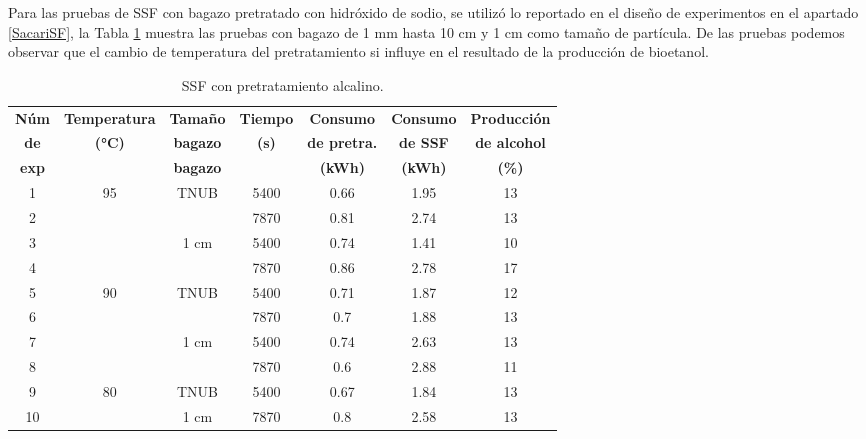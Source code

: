 \documentclass[12pt]{article}
\begin{document}
		Para las pruebas de SSF con bagazo pretratado con hidróxido de sodio, se utilizó lo reportado en el diseño de experimentos en el apartado \ref{SacariSF}, la Tabla \ref{ssf con Pretratamiento Alcalino}  muestra las pruebas con bagazo de 1 mm hasta 10 cm y 1 cm como tamaño de partícula. De las pruebas podemos observar que el cambio de temperatura del pretratamiento si influye en el resultado de la producción de bioetanol.
		
		
		\begin{table}[H]
			\centering
			\caption{SSF con pretratamiento alcalino.}
			\begin{tabular}{|c|c|c|c|c|c|c|}
				\hline
				\textbf{Núm} & \textbf{Temperatura} & \textbf{Tamaño} & \textbf{Tiempo} & \textbf{Consumo } & \textbf{Consumo } & \textbf{Producción } \\
			\textbf{de}	&\textbf{ (°C)}& \textbf{bagazo}&\textbf{(s)}	&\textbf{de pretra. }&\textbf{ de SSF}&\textbf{ de alcohol}\\ 
				\textbf{exp}	& & \textbf{bagazo}&	&\textbf{ (kWh)}&\textbf{ (kWh)}&\textbf{ (\%)}\\ \hline
			
			
				1 & \multirow{4}{*}{95} & \multirow{2}{*}{TNUB} & 5400 &0.66& 1.95 & 13 \\ \cline{1-1} \cline{4-7}
				2 &                     &                       & 7870 &0.81& 2.74 & 13 \\ \cline{3-7}  \cline{1-1}
				3 &                     &\multirow{2}{*}{1 cm}  & 5400 &0.74& 1.41 & 10 \\ \cline{4-7}  \cline{1-1}
				4 &                     &                       & 7870 &0.86& 2.78 & 17 \\ \hline
				5 & \multirow{4}{*}{90} & \multirow{2}{*}{TNUB} & 5400 &0.71& 1.87 & 12 \\  \cline{1-1} \cline{4-7}
				6 &                     &                       & 7870 &0.7& 1.88 & 13 \\ \cline{1-1} \cline{3-7}
				7 &                     & \multirow{2}{*}{1 cm} & 5400 &0.74& 2.63 & 13 \\ \cline{1-1} \cline{4-7}
				8 &                     &                       & 7870 & 0.6&2.88 & 11 \\ \hline
				9 &\multirow{2}{*}{80 } & TNUB                  & 5400 &0.67 &1.84 & 13 \\ \cline{1-1} \cline{3-7}
				10 &                     & 1 cm                 & 7870 & 0.8&2.58 & 13 \\ \hline
			\end{tabular}
			\label{ssf con Pretratamiento Alcalino}
		\end{table}
		
\end{document}

